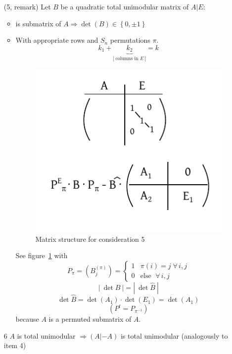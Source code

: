\documentclass{article}
\newcommand{\card}[1]{\left|\:\!#1\:\!\right|}
\newcommand{\set}[1]{\left\{#1\right\}}
\newcommand{\fall}{\;\forall\,}
\begin{document}
\begin{enumerate}
  \item[(5, remark)]
    Let $B$ be a quadratic total unimodular matrix of $A | E$:
    \begin{itemize}
      \item is submatrix of $A \Rightarrow \det(B) \in \set{0, \pm1}$
      \item
        With appropriate rows and $S_n$ permutations $\pi$.
        \[ k_1 + \underbrace{k_2}_{\card{\text{columns in $E$}}} = k \]
        \begin{figure}[!ht]
          \begin{center}
            \includegraphics{img/tum_second.pdf}
            \caption{Matrix structure for consideration 5}
            \label{fig:consid-5}
          \end{center}
        \end{figure}
        See figure~\ref{fig:consid-5} with \[
          P_\pi = (B_j^{(\pi)}) = \begin{cases}
            1 & \pi(i) = j \fall i,j \\
            0 & \text{else } \fall i,j
          \end{cases}
        \]
        \[ \card{\det{B}} = \card{\det{\hat{B}}} \]
        \[ \det\hat{B} = \det(A_1) \cdot \det(E_1) = \det(A_1) \]
        \[ \left(P^t = P_{\pi^{-1}}\right) \]
        because $A$ is a permuted submatrix of $A$.
    \end{itemize}

  \item[6]
    $A$ is total unimodular $\Rightarrow (A | -A)$ is total unimodular (analogously to item 4)
\end{enumerate}
\end{document}
